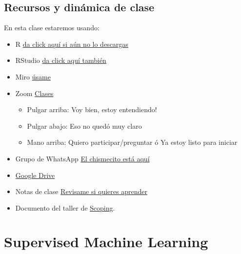 \documentclass[
]{book}
\providecommand{\tightlist}{%
  \setlength{\itemsep}{0pt}\setlength{\parskip}{0pt}}
\begin{document}
\hypertarget{recursos-y-dinuxe1mica-de-clase}{%
\section{Recursos y dinámica de clase}\label{recursos-y-dinuxe1mica-de-clase}}

En esta clase estaremos usando:

\begin{itemize}
\tightlist
\item
  R \href{https://cran.r-project.org/}{da click aquí si aún no lo descargas}
\item
  RStudio \href{https://www.rstudio.com/products/rstudio/download/}{da click aquí también}
\item
  Miro \href{https://miro.com/welcomeonboard/c3huendzNURhRUVGbHlsWGVFYlBBMXRaSncybXRrbjBRU2R5WWg2eDFKUXY1VlJ1SGJFdmc4ZmRuWEgwcllpenwzMDc0NDU3MzYxMzQwNDIyODEy?invite_link_id=152058640259}{úsame}
\item
  Zoom \href{https://us02web.zoom.us/j/5155440751?pwd=YzJCOGF0VnlZdlZlS0Fpc3MvZEhadz09}{Clases}

  \begin{itemize}
  \tightlist
  \item
    Pulgar arriba: Voy bien, estoy entendiendo!
  \item
    Pulgar abajo: Eso no quedó muy claro
  \item
    Mano arriba: Quiero participar/preguntar ó Ya estoy listo para iniciar
  \end{itemize}
\item
  Grupo de WhatsApp \href{https://chat.whatsapp.com/KUbqIk8Cqu42zkXffIgUQQ}{El chismecito está aquí}
\item
  \href{https://drive.google.com/drive/folders/1IblKYfDpSjV89FBT3c-PafOiD4wW7UrD?usp=sharing}{Google Drive}
\item
  Notas de clase \href{https://acturio.github.io/amt22_03intro2mls2/}{Revisame si quieres aprender}
\item
  Documento del taller de \href{https://docs.google.com/spreadsheets/d/1hCRt00nYyZvbkfi9yOMRSR0R30lPRtKzaNKKlgAE78M/edit?usp=sharing}{Scoping}.
\end{itemize}

\hypertarget{supervised-machine-learning}{%
\chapter{Supervised Machine Learning}\label{supervised-machine-learning}}
\end{document}
